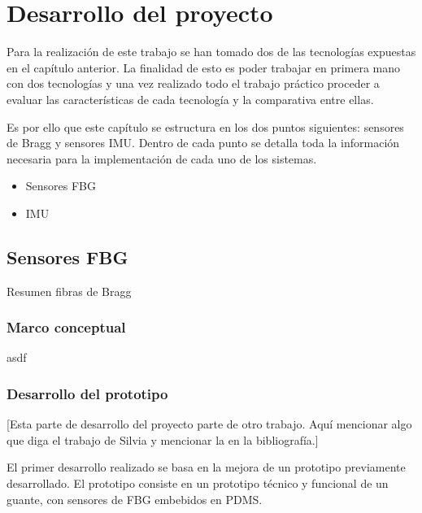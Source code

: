 \chapter{Desarrollo del proyecto\label{sec:disenho}}

Para la realización de este trabajo se han tomado dos  de las tecnologías expuestas en el capítulo anterior. %
La finalidad de esto es poder trabajar en primera mano con dos tecnologías y una vez realizado todo el trabajo práctico proceder a evaluar las características de cada tecnología y la comparativa entre ellas.

Es por ello que este capítulo se estructura en los dos puntos siguientes: sensores de Bragg y sensores IMU. Dentro de cada punto se detalla toda la información necesaria para la implementación de cada uno de los sistemas.\cite{SilviaTFM}

\begin{itemize}
	\item {Sensores FBG}
	\item {IMU}
\end{itemize}

\section{Sensores FBG}
\label{sec:FBG3}

Resumen fibras de Bragg


\subsection{Marco conceptual}
\label{sec:mc3FBG}
asdf

\subsection{Desarrollo del prototipo}
\label{sec:prot3FBG}
[Esta parte de desarrollo del proyecto parte de otro trabajo. Aquí mencionar algo que diga el trabajo de Silvia y mencionar la en la bibliografía.]

El primer desarrollo realizado se basa en la mejora de un prototipo previamente desarrollado. El prototipo consiste en un prototipo técnico y funcional de un guante, con sensores de FBG embebidos en PDMS. \cite{SilviaTFM}



